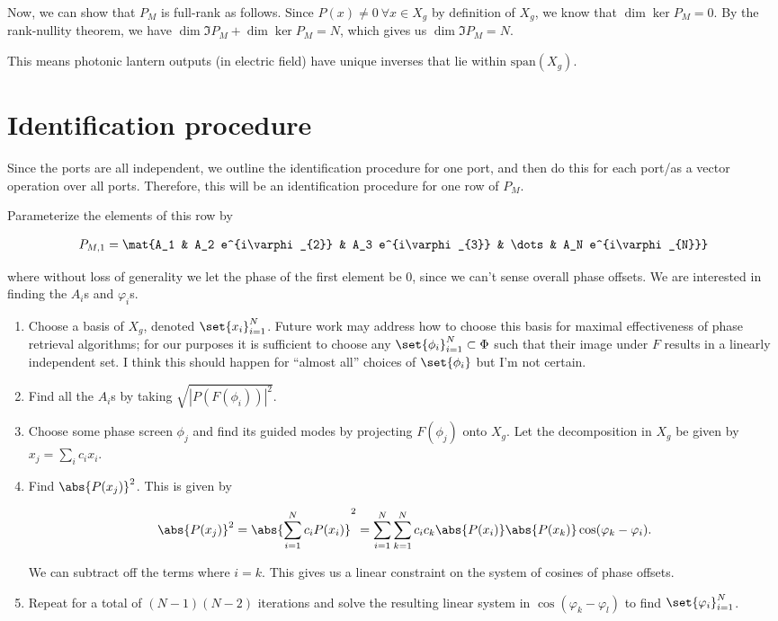 \documentclass{article}
\begin{document}
    Now, we can show that $P_M$ is full-rank as follows. Since $P(x) \neq 0 \ \forall x \in X_g$ by definition of $X_g$, we know that $\dim \ker P_M = 0$. By the rank-nullity theorem, we have $\dim \Im P_M + \dim \ker P_M = N$, which gives us $\dim \Im P_M = N$.

    This means photonic lantern outputs (in electric field) have unique inverses that lie within $\mathrm{span}(X_g)$. 

    \section{Identification procedure}

    Since the ports are all independent, we outline the identification procedure for one port, and then do this for each port/as a vector operation over all ports. Therefore, this will be an identification procedure for one row of $P_M$.

    Parameterize the elements of this row by

    \begin{align*}
        P_{M,1} = \mat{A_1 & A_2 e^{i\varphi_{2}} & A_3 e^{i\varphi_{3}} & \dots & A_N e^{i\varphi_{N}}}
    \end{align*}

    where without loss of generality we let the phase of the first element be 0, since we can't sense overall phase offsets. We are interested in finding the $A_i$s and $\varphi_{i}$s.

    \begin{enumerate}
        \item Choose a basis of $X_g$, denoted $\set{x_i}_{i=1}^N$. Future work may address how to choose this basis for maximal effectiveness of phase retrieval algorithms; for our purposes it is sufficient to choose any $\set{\phi_i}_{i=1}^N \subset \Phi$ such that their image under $F$ results in a linearly independent set. I think this should happen for ``almost all'' choices of $\set{\phi_i}$ but I'm not certain.
        \item Find all the $A_i$s by taking $\sqrt{|P(F(\phi_i))|^2}$.
        \item Choose some phase screen $\phi_j$ and find its guided modes by projecting $F(\phi_j)$ onto $X_g$. Let the decomposition in $X_g$ be given by $x_j = \sum_i c_i x_i$. 
        \item Find $\abs{P(x_j)}^2$. This is given by
        
        \begin{align*}
            \abs{P(x_j)}^2 = \abs{\sum_{i=1}^N c_i P(x_i)}^2 = \sum_{i=1}^N \sum_{k=1}^N c_i c_k \abs{P(x_i)} \abs{P(x_k)} \cos(\varphi_k - \varphi_i).
        \end{align*}

        We can subtract off the terms where $i = k$. This gives us a linear constraint on the system of cosines of phase offsets. 

        \item Repeat for a total of $(N-1)(N-2)$ iterations and solve the resulting linear system in $\cos(\varphi_k - \varphi_l)$ to find $\set{\varphi_i}_{i=1}^N$. 
    \end{enumerate}
\end{document}
